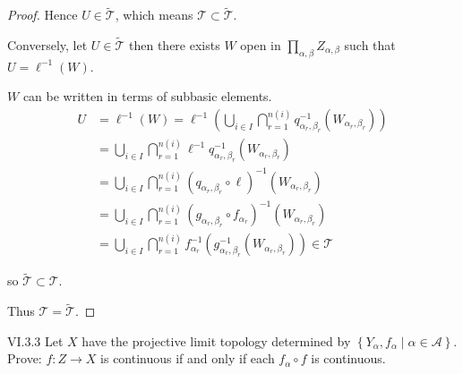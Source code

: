 \begin{proof}
	Hence \( U \in \widetilde{\mathscr{T}} \), which means \( \mathscr{T} \subset \widetilde{\mathscr{T}} \).

	\bigskip
	Conversely, let \( U \in \widetilde{\mathscr{T}} \) then there exists \( W \) open in \( \prod_{\alpha,\beta} Z_{\alpha,\beta} \) such that \( U = \ell^{-1}(W) \).

	\( W \) can be written in terms of subbasic elements.
	\begingroup
	\allowdisplaybreaks%
	\begin{align*}
		U & = \ell^{-1}(W) = \ell^{-1}\left( \bigcup_{i\in I}\bigcap^{n(i)}_{r=1} q^{-1}_{\alpha_{r},\beta_{r}}(W_{\alpha_{r},\beta_{r}}) \right) \\
		  & = \bigcup_{i\in I}\bigcap^{n(i)}_{r=1} \ell^{-1}q^{-1}_{\alpha_{r},\beta_{r}}(W_{\alpha_{r},\beta_{r}})                               \\
		  & = \bigcup_{i\in I}\bigcap^{n(i)}_{r=1} {(q_{\alpha_{r},\beta_{r}}\circ \ell)}^{-1}(W_{\alpha_{r},\beta_{r}})                          \\
		  & = \bigcup_{i\in I}\bigcap^{n(i)}_{r=1} {(g_{\alpha_{r},\beta_{r}}\circ f_{\alpha_{r}})}^{-1}(W_{\alpha_{r},\beta_{r}})                \\
		  & = \bigcup_{i\in I}\bigcap^{n(i)}_{r=1} f_{\alpha_{r}}^{-1}(g_{\alpha_{r},\beta_{r}}^{-1}(W_{\alpha_{r},\beta_{r}})) \in \mathscr{T}
	\end{align*}
	\endgroup

	so \( \widetilde{\mathscr{T}} \subset \mathscr{T} \).

	Thus \( \mathscr{T} = \widetilde{\mathscr{T}} \).
\end{proof}

\begin{problem}{VI.3.3}
Let \(X\) have the projective limit topology determined by \( \left\{ Y_{\alpha}, f_{\alpha} \mid \alpha \in \mathscr{A} \right\} \). Prove: \( f: Z \to X \) is continuous if and only if each \( f_{\alpha} \circ f \) is continuous.
\end{problem}

